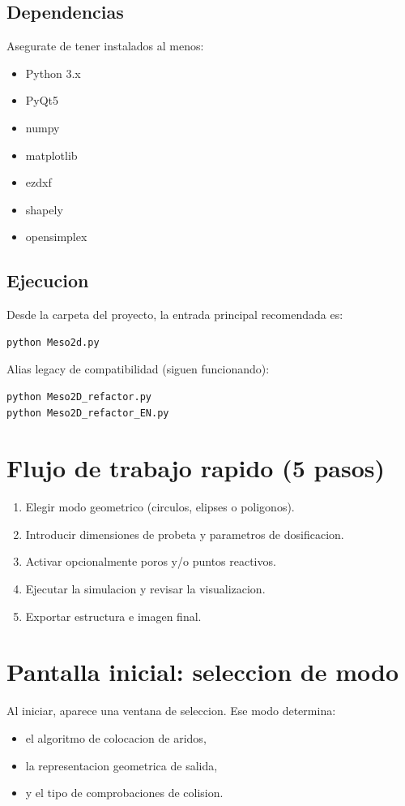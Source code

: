 \documentclass[11pt,a4paper]{article}
\begin{document}
\subsection{Dependencias}
Asegurate de tener instalados al menos:
\begin{itemize}[leftmargin=1.5em]
  \item Python 3.x
  \item PyQt5
  \item numpy
  \item matplotlib
  \item ezdxf
  \item shapely
  \item opensimplex
\end{itemize}

\subsection{Ejecucion}
Desde la carpeta del proyecto, la entrada principal recomendada es:
\begin{lstlisting}[style=cmd]
python Meso2d.py
\end{lstlisting}

Alias legacy de compatibilidad (siguen funcionando):
\begin{lstlisting}[style=cmd]
python Meso2D_refactor.py
python Meso2D_refactor_EN.py
\end{lstlisting}

\section{Flujo de trabajo rapido (5 pasos)}
\begin{enumerate}[leftmargin=1.7em]
  \item Elegir modo geometrico (circulos, elipses o poligonos).
  \item Introducir dimensiones de probeta y parametros de dosificacion.
  \item Activar opcionalmente poros y/o puntos reactivos.
  \item Ejecutar la simulacion y revisar la visualizacion.
  \item Exportar estructura e imagen final.
\end{enumerate}

\section{Pantalla inicial: seleccion de modo}
Al iniciar, aparece una ventana de seleccion. Ese modo determina:
\begin{itemize}[leftmargin=1.5em]
  \item el algoritmo de colocacion de aridos,
  \item la representacion geometrica de salida,
  \item y el tipo de comprobaciones de colision.
\end{itemize}
\end{document}

